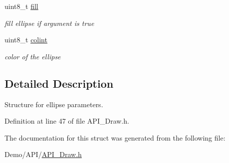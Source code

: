 \begin{DoxyCompactItemize}
\mbox{\label{struct_e_l_l_i_p_s_e_a2ffb43952012965173826ee9554c864a}} 
uint8\+\_\+t \hyperlink{struct_e_l_l_i_p_s_e_a2ffb43952012965173826ee9554c864a}{fill}
\begin{DoxyCompactList}\small\item\em fill ellipse if argument is true \end{DoxyCompactList}\item 
\mbox{\label{struct_e_l_l_i_p_s_e_a21caa4b27a71b7967f1a2d64f196a674}} 
uint8\+\_\+t \hyperlink{struct_e_l_l_i_p_s_e_a21caa4b27a71b7967f1a2d64f196a674}{colint}
\begin{DoxyCompactList}\small\item\em color of the ellipse \end{DoxyCompactList}\end{DoxyCompactItemize}


\subsection{Detailed Description}
Structure for ellipse parameters. 

Definition at line 47 of file A\+P\+I\+\_\+\+Draw.\+h.



The documentation for this struct was generated from the following file\+:\begin{DoxyCompactItemize}
\item 
Demo/\+A\+P\+I/\hyperlink{_a_p_i___draw_8h}{A\+P\+I\+\_\+\+Draw.\+h}\end{DoxyCompactItemize}
